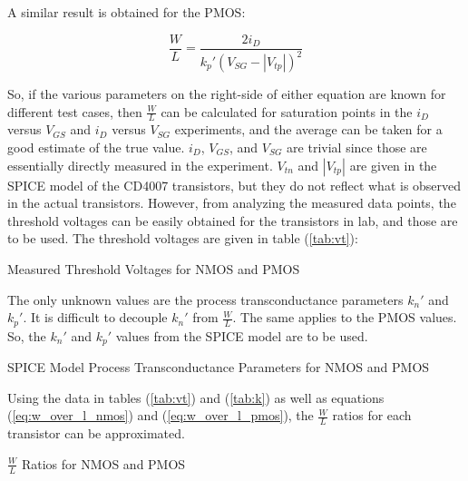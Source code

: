 A similar result is obtained for the PMOS:

\begin{equation}
	\label{eq:w_over_l_pmos}
	\frac{W}{L} = \frac{ 2 i_{D}}{k_{p}' (V_{SG} - |V_{tp}|)^{2}}
\end{equation}

So, if the various parameters on the right-side of either equation are known for different test cases, then $\frac{W}{L}$ can be calculated for saturation points in the $i_{D}$ versus $V_{GS}$ and $i_{D}$ versus $V_{SG}$ experiments, and the average can be taken for a good estimate of the true value.
$i_{D}$, $V_{GS}$, and $V_{SG}$ are trivial since those are essentially directly measured in the experiment.
$V_{tn}$ and $|V_{tp}|$ are given in the SPICE model of the CD4007 transistors, but they do not reflect what is observed in the actual transistors.
However, from analyzing the measured data points, the threshold voltages can be easily obtained for the transistors in lab, and those are to be used.
The threshold voltages are given in table (\ref{tab:vt}):

\FloatBarrier

\begin{table}[h!]
	\centering
	\caption{Measured Threshold Voltages for NMOS and PMOS}
	\label{tab:vt}
\end{table}

\FloatBarrier

The only unknown values are the process transconductance parameters $k_{n}'$ and $k_{p}'$.
It is difficult to decouple $k_{n}'$ from $\frac{W}{L}$.
The same applies to the PMOS values.
So, the $k_{n}'$ and $k_{p}'$ values from the SPICE model are to be used.

\FloatBarrier

\begin{table}[h!]
	\centering
	\caption{SPICE Model Process Transconductance Parameters for NMOS and PMOS}
	\label{tab:k}
\end{table}

\FloatBarrier

Using the data in tables (\ref{tab:vt}) and (\ref{tab:k}) as well as equations (\ref{eq:w_over_l_nmos}) and (\ref{eq:w_over_l_pmos}), the $\frac{W}{L}$ ratios for each transistor can be approximated.

\FloatBarrier

\begin{table}[h!]
	\centering
	\caption{$\frac{W}{L}$ Ratios for NMOS and PMOS}
	\label{tab:w_over_l}
\end{table}

\FloatBarrier
